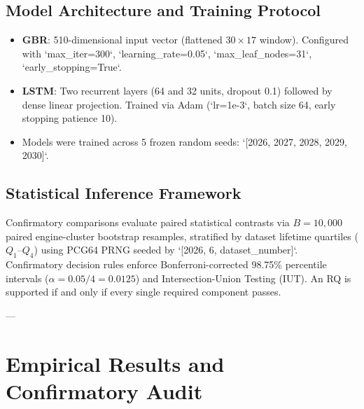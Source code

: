 \documentclass[conference]{IEEEtran}
\begin{document}
\subsection{Model Architecture and Training Protocol}
\begin{itemize}
    \item \textbf{GBR}: 510-dimensional input vector (flattened $30 \times 17$ window). Configured with `max_iter=300`, `learning_rate=0.05`, `max_leaf_nodes=31`, `early_stopping=True`.
    \item \textbf{LSTM}: Two recurrent layers (64 and 32 units, dropout 0.1) followed by dense linear projection. Trained via Adam (`lr=1e-3`, batch size 64, early stopping patience 10).
    \item Models were trained across 5 frozen random seeds: `[2026, 2027, 2028, 2029, 2030]`.
\end{itemize}

\subsection{Statistical Inference Framework}
Confirmatory comparisons evaluate paired statistical contrasts via $B = 10{,}000$ paired engine-cluster bootstrap resamples, stratified by dataset lifetime quartiles ($Q_1$--$Q_4$) using PCG64 PRNG seeded by `[2026, 6, dataset_number]`. Confirmatory decision rules enforce Bonferroni-corrected 98.75\% percentile intervals ($\alpha = 0.05 / 4 = 0.0125$) and Intersection-Union Testing (IUT). An RQ is supported if and only if every single required component passes.

---

\section{Empirical Results and Confirmatory Audit}
\end{document}

